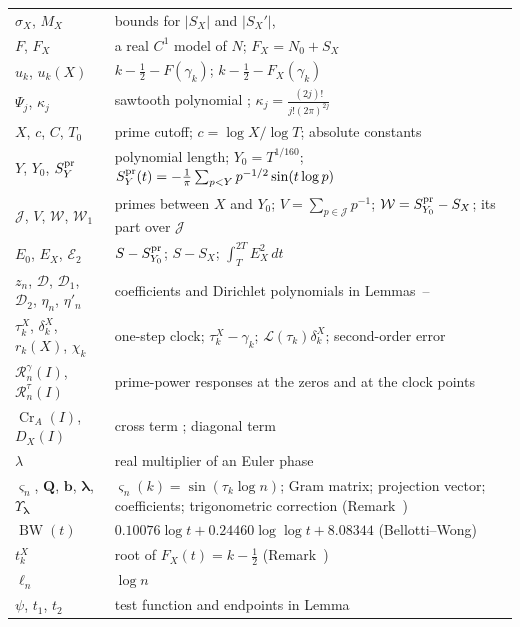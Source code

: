\documentclass[preprint,12pt]{elsarticle}
\makeatletter
\let\CG@origref\ref
\let\CG@origeqref\eqref
\newcommand{\CG@gettip}[1]{\@ifundefined{CGTip@#1}{Reference: #1}{\csname CGTip@#1\endcsname}}
\DeclareRobustCommand{\CGref}[1]{\pdftooltip{\CG@origref{#1}}{\CG@gettip{#1}}}
\DeclareRobustCommand{\CGeqref}[1]{\pdftooltip{\CG@origeqref{#1}}{\CG@gettip{#1}}}
\numberwithin{equation}{section}
\theoremstyle{plain}
\theoremstyle{definition}
\theoremstyle{remark}
\newcommand{\NO}{N_0}
\newcommand{\lL}{\mathcal L}
\newcommand{\Cr}{\operatorname{Cr}}
\newcommand{\BW}{\operatorname{BW}}
\newcommand{\Rg}{\mathcal R^{\gamma}}
\newcommand{\Rt}{\mathcal R^{\tau}}
\makeatother
\begin{document}
\begin{center}
\begin{longtable}{p{}p{}}
$\sigma_X$, $M_X$ & bounds for $|S_X|$ and $|S_X'|$, \CGeqref{eq:sigma_M_def}\\
$F$, $F_X$ & a real $C^1$ model of $N$; $F_X=\NO+S_X$\\
$u_k$, $u_k(X)$ & $k-\frac12-F(\gamma_k)$; $k-\frac12-F_X(\gamma_k)$\\
$\Psi_j$, $\kappa_j$ & sawtooth polynomial \CGeqref{eq:Psi_def}; $\kappa_j=\frac{(2j)!}{j!(2\pi)^{2j}}$\\
$X$, $c$, $C$, $T_0$ & prime cutoff; $c=\log X/\log T$; absolute constants\\
$Y$, $Y_0$, $S^{\rm pr}_Y$ & polynomial length; $Y_0=T^{1/160}$; $S^{\rm pr}_Y(t)=-\frac1\pi\sum_{p<Y}p^{-1/2}\sin(t\log p)$\\
$\mathcal J$, $V$, $\mathcal W$, $\mathcal W_1$ & primes between $X$ and $Y_0$; $V=\sum_{p\in\mathcal J}p^{-1}$; $\mathcal W=S^{\rm pr}_{Y_0}-S_X$; its part over $\mathcal J$ \CGeqref{eq:D_def}\\
$E_0$, $E_X$, $\mathcal E_2$ & $S-S^{\rm pr}_{Y_0}$; $S-S_X$; $\int_T^{2T}E_X^2\,dt$\\
$z_n$, $\mathcal D$, $\mathcal D_1$, $\mathcal D_2$, $\eta_n$, $\eta'_n$ & coefficients and Dirichlet polynomials in Lemmas~\CGref{lem:trig_MV}--\CGref{lem:D_moments}\\
$\tau_k^X$, $\delta_k^X$, $r_k(X)$, $\chi_k$ & one-step clock; $\tau_k^X-\gamma_k$; $\lL(\tau_k)\delta_k^X$; second-order error \CGeqref{eq:one_step_decomposition}\\
$\Rg_n(I)$, $\Rt_n(I)$ & prime-power responses at the zeros and at the clock points \CGeqref{eq:two_responses}\\
$\Cr_A(I)$, $D_X(I)$ & cross term \CGeqref{eq:Cr_def}; diagonal term \CGeqref{eq:full_factor_gain}\\
$\lambda$ & real multiplier of an Euler phase\\
$\varsigma_n$, $\mathbf Q$, $\mathbf b$, $\boldsymbol\lambda$, $\Upsilon_{\boldsymbol\lambda}$ & $\varsigma_n(k)=\sin(\tau_k\log n)$; Gram matrix; projection vector; coefficients; trigonometric correction (Remark~\CGref{rem:matrix_projection})\\
$\BW(t)$ & $0.10076\log t+0.24460\log\log t+8.08344$ (Bellotti--Wong)\\
$t_k^X$ & root of $F_X(t)=k-\frac12$ (Remark~\CGref{rem:localization})\\
$\ell_n$ & $\log n$\\
$\psi$, $t_1$, $t_2$ & test function and endpoints in Lemma~\CGref{lem:first_moment_identity}\\

\end{longtable}
\end{center}
\end{document}
